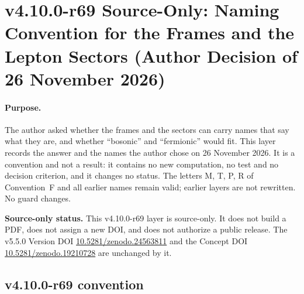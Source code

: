 
\clearpage
\section*{v4.10.0-r69 Source-Only: Naming Convention for the Frames and the Lepton Sectors (Author Decision of 26 November 2026)}
\label{sec:v4100-r69-naming}

\paragraph{Purpose.}
The author asked whether the frames and the sectors can carry names that say what they are, and whether ``bosonic'' and ``fermionic'' would
fit.  This layer records the answer and the names the author chose on 26 November 2026.  It is a convention and not a result: it contains no
new computation, no test and no decision criterion, and it changes no status.  The letters M, T, P, R of Convention~F and all earlier names
remain valid; earlier layers are not rewritten.  No guard changes.

\noindent\textbf{Source-only status.}
This v4.10.0-r69 layer is source-only.  It does not build a PDF, does not assign a new DOI,
and does not authorize a public release.  The v5.5.0 Version DOI
\href{https://doi.org/10.5281/zenodo.24563811}{10.5281/zenodo.24563811} and the Concept DOI
\href{https://doi.org/10.5281/zenodo.19210728}{10.5281/zenodo.19210728} are unchanged by it.

\subsection*{v4.10.0-r69 convention}
\label{subsec:v4100-r69-convention}

